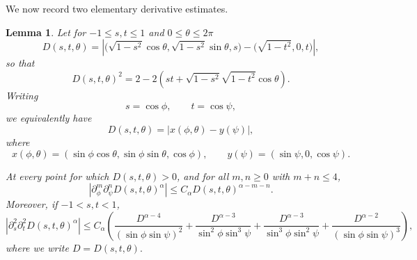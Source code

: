 \documentclass[11pt]{amsart}
\newtheorem{lemma}[theorem]{Lemma}
\begin{document}
We now record two elementary derivative estimates.

\begin{lemma}
\label{lem:derivative-bounds}
Let for $-1\le s,t\le 1$ and $0\le \theta\le 2\pi$
\[
D(s,t,\theta)
=
\left|
\bigl(\sqrt{1-s^2}\cos\theta,
      \sqrt{1-s^2}\sin\theta,s\bigr)
-
\bigl(\sqrt{1-t^2},0,t\bigr)
\right|,
\]
so that
\[
D(s,t,\theta)^2
=
2-2\left(
st+\sqrt{1-s^2}\sqrt{1-t^2}\cos\theta
\right).
\]
Writing
\[
s=\cos\phi,\qquad t=\cos\psi,
\]
we equivalently have
\[
D(s,t,\theta)
=
|x(\phi,\theta)-y(\psi)|,
\]
where
\[
x(\phi,\theta)
=
(\sin\phi\cos\theta,\sin\phi\sin\theta,\cos\phi),
\qquad
y(\psi)
=
(\sin\psi,0,\cos\psi).
\]

At every point for which $D(s,t,\theta)>0$, and for all
$m,n\ge0$ with $m+n\le4$,
\begin{equation}
\label{eq:polar-derivatives}
\left|
\partial_\phi^m\partial_\psi^n
D(s,t,\theta)^\alpha
\right|
\le
C_\alpha
D(s,t,\theta)^{\alpha-m-n}.
\end{equation}
Moreover, if $-1<s,t<1$,
\begin{equation}\label{eq:height-derivatives}
\left|
\partial_s^2\partial_t^2
D(s,t,\theta)^\alpha
\right|
\le C_\alpha\left(
\frac{D^{\alpha-4}}{(\sin\phi\sin\psi)^{2}}
+\frac{D^{\alpha-3}}{\sin^{2} \phi \sin^{3} \psi}
+\frac{D^{\alpha-3}}{\sin^3 \phi \sin^2 \psi}
+\frac{D^{\alpha-2}}{(\sin\phi\sin\psi)^{3}}
\right),
\end{equation}
where we write $D=D(s,t,\theta).$
\end{lemma}
\end{document}
